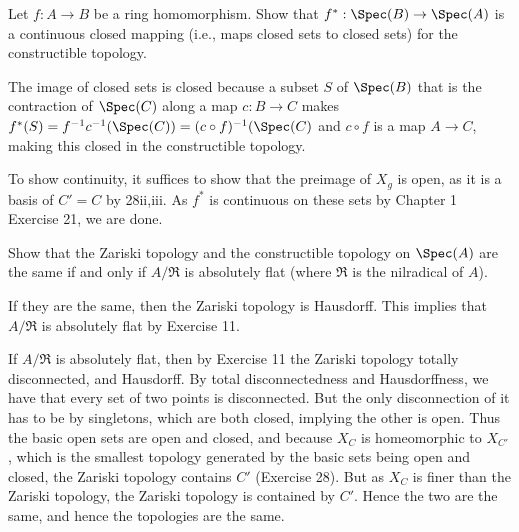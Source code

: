 \documentclass[a4paper]{exam}
\newif\ifhint
\begin{document}
\begin{questions}
\question Let $f: A\to B $ be a ring homomorphism. Show that $f^\ast: \Spec(B) \to \Spec(A) $ is a continuous closed mapping (i.e., maps closed sets to closed sets) for the constructible topology.
\begin{solution}
	The image of closed sets is closed because a subset $S $ of $\Spec(B) $ that is the contraction of $\Spec(C) $ along a map $c: B \to C $ makes $f^\ast(S) = f^{-1}c^{-1}(\Spec(C)) = (c\circ f)^{-1}(\Spec(C)$ and $c\circ f $ is a map $A\to C $, making this closed in the constructible topology.

	To show continuity, it suffices to show that the preimage of $X_g$ is open, as it is a basis of $C'=C$ by 28ii,iii.
	As $f^\ast $ is continuous on these sets by Chapter 1 Exercise 21, we are done.
\end{solution}

\question Show that the Zariski topology and the constructible topology on $\Spec(A) $ are the same if and only if $A / \mathfrak{R} $ is absolutely flat (where $\mathfrak{R} $ is the nilradical of $A $).
\ifhint
	Use Exercise 11.
\fi
\begin{solution}
	If they are the same, then the Zariski topology is Hausdorff.
	This implies that $A / \mathfrak{R} $ is absolutely flat by Exercise 11.

	If $A / \mathfrak{R} $ is absolutely flat, then by Exercise 11 the Zariski topology totally disconnected, and Hausdorff.
	By total disconnectedness and Hausdorffness, we have that every set of two points is disconnected.
	But the only disconnection of it has to be by singletons, which are both closed, implying the other is open.
	Thus the basic open sets are open and closed, and because $X_C $ is homeomorphic to $X_{C'} $, which is the smallest topology generated by the basic sets being open and closed, the Zariski topology contains $C' $ (Exercise 28).
	But as $X_C $ is finer than the Zariski topology, the Zariski topology is contained by $C'$.
	Hence the two are the same, and hence the topologies are the same.
\end{solution}
\end{questions}
\end{document}
